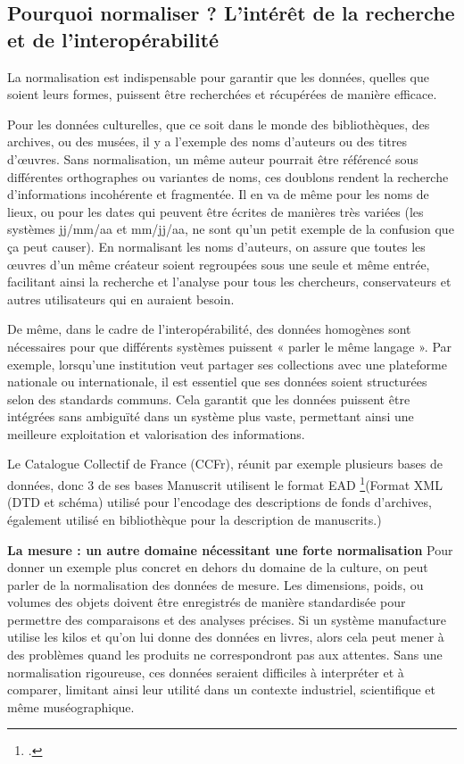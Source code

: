 \subsection{Pourquoi normaliser ? L’intérêt de la recherche et de l’interopérabilité}

La normalisation est indispensable pour garantir que les données, quelles que soient leurs formes, puissent être recherchées et récupérées de manière efficace. \newline

Pour les données culturelles, que ce soit dans le monde des bibliothèques, des archives, ou des musées, il y a l'exemple des noms d'auteurs ou des titres d'œuvres. Sans normalisation, un même auteur pourrait être référencé sous différentes orthographes ou variantes de noms, ces doublons rendent la recherche d'informations incohérente et fragmentée.  Il en va de même pour les noms de lieux, ou pour les dates qui peuvent être écrites de manières très variées (les systèmes jj/mm/aa et mm/jj/aa, ne sont qu’un petit exemple de la confusion que ça peut causer). En normalisant les noms d’auteurs, on assure que toutes les œuvres d’un même créateur soient regroupées sous une seule et même entrée, facilitant ainsi la recherche et l’analyse pour tous les chercheurs, conservateurs et autres utilisateurs qui en auraient besoin. \newline

De même, dans le cadre de l’interopérabilité, des données homogènes sont nécessaires pour que différents systèmes puissent « parler le même langage ». Par exemple, lorsqu'une institution veut partager ses collections avec une plateforme nationale ou internationale, il est essentiel que ses données soient structurées selon des standards communs. Cela garantit que les données puissent être intégrées sans ambiguïté dans un système plus vaste, permettant ainsi une meilleure exploitation et valorisation des informations. \newline

Le Catalogue Collectif de France (CCFr), réunit par exemple plusieurs bases de données, donc 3 de ses bases Manuscrit utilisent le format EAD \footcite{falconnet_sirdey_borda}(Format XML (DTD et schéma) utilisé pour l’encodage des descriptions de fonds d’archives, également utilisé en bibliothèque pour la description de manuscrits.)\newline

\textbf{La mesure : un autre domaine nécessitant une forte normalisation}\newline
Pour donner un exemple plus concret en dehors du domaine de la culture, on peut parler de la normalisation des données de mesure. Les dimensions, poids, ou volumes des objets doivent être enregistrés de manière standardisée pour permettre des comparaisons et des analyses précises. Si un système manufacture utilise les kilos et qu’on lui donne des données en livres, alors cela peut mener à des problèmes quand les produits ne correspondront pas aux attentes. Sans une normalisation rigoureuse, ces données seraient difficiles à interpréter et à comparer, limitant ainsi leur utilité dans un contexte industriel, scientifique  et même muséographique.

